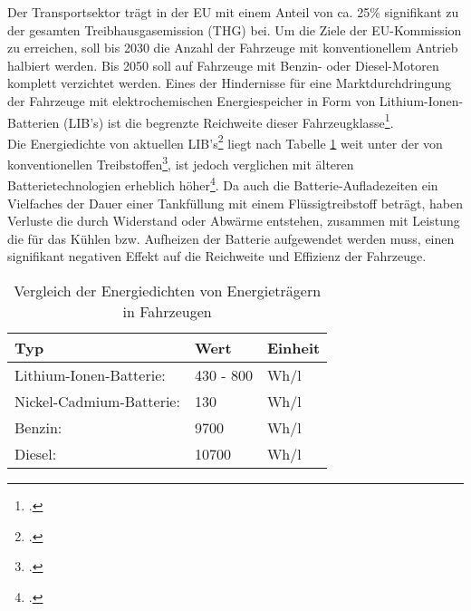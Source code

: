 Der Transportsektor trägt in der EU mit einem Anteil von ca. 25\% signifikant zu der gesamten Treibhausgasemission (THG) bei. Um die Ziele der EU-Kommission zu erreichen, soll bis 2030 die Anzahl der Fahrzeuge mit konventionellem Antrieb halbiert werden. Bis 2050 soll auf Fahrzeuge mit Benzin- oder Diesel-Motoren komplett verzichtet werden. Eines der Hindernisse für eine Marktdurchdringung der Fahrzeuge mit elektrochemischen Energiespeicher in Form von Lithium-Ionen-Batterien (LIB's) ist die begrenzte Reichweite dieser Fahrzeugklasse\footcite[Vgl.][S.136-146]{Ajanovic2020}.\\
Die Energiedichte von aktuellen LIB's\footcite[Vgl.][S. 11]{Hettesheimer2017} liegt nach Tabelle \ref{tab:Energiedichten} weit unter der von konventionellen Treibstoffen\footcite[Vgl.][]{BeloitEDU2021}, ist jedoch verglichen mit älteren Batterietechnologien erheblich höher\footcite[Vgl.][]{Sollmann2018}. Da auch die Batterie-Aufladezeiten ein Vielfaches der Dauer einer Tankfüllung mit einem Flüssigtreibstoff beträgt, haben Verluste die durch Widerstand oder Abwärme entstehen, zusammen mit Leistung die für das Kühlen bzw. Aufheizen der Batterie aufgewendet werden muss, einen signifikant negativen Effekt auf die Reichweite und Effizienz der Fahrzeuge.\\

\begin{table}[H]
	\caption{Vergleich der Energiedichten von Energieträgern in Fahrzeugen}
	\label{tab:Energiedichten}
	\vspace{0.2cm}	
	\begin{tabularx}{\textwidth}{ |X|X|X|  }
		\toprule[1.5pt]
		\textbf{Typ} & \textbf{Wert} & \textbf{Einheit} \\
		\hline\hline
		Lithium-Ionen-Batterie: & 430 - 800 & Wh/l \\
		\hline
		Nickel-Cadmium-Batterie: & 130 & Wh/l \\
		\hline
		Benzin: & 9700 & Wh/l \\
		\hline
		Diesel: & 10700 & Wh/l \\
		\bottomrule[1.5pt]
	\end{tabularx}		
\end{table}

